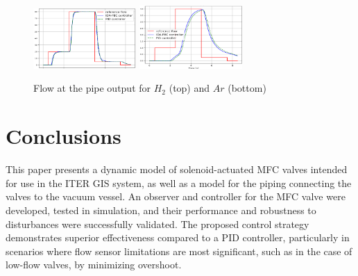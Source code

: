 \documentclass[letterpaper, 10pt, conference]{ieeeconf}
\begin{document}
\begin{figure}[!ht]
    \centering
    \includegraphics[width=0.35\textwidth]{ctrlsteps_H2_pipeout.png}
    \includegraphics[width=0.35\textwidth]{ctrlsteps_Ar_pipeout.png}
    \caption{Flow at the pipe output for $H_2$ (top) and $Ar$ (bottom)}
    \label{fig:ctrlstep_pipeout}
\end{figure}


\section{Conclusions}\label{sec:conclusion}
This paper presents a dynamic model of solenoid-actuated MFC valves intended for use in the ITER GIS system, as well as a model for the piping connecting the valves to the vacuum vessel. An observer and controller for the MFC valve were developed, tested in simulation, and their performance and robustness to disturbances were successfully validated. The proposed control strategy demonstrates superior effectiveness compared to a PID controller, particularly in scenarios where flow sensor limitations are most significant, such as in the case of low-flow valves, by minimizing overshoot.

 
\end{document}
